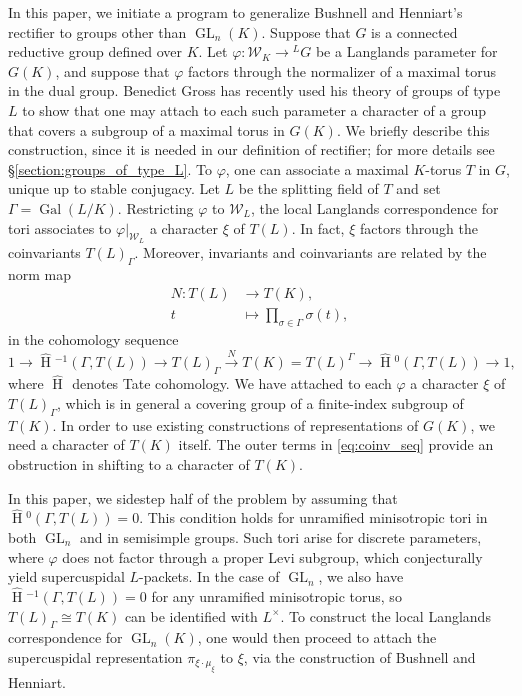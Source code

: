 \documentclass{amsart}
\theoremstyle{plain}
\newcommand{\HT}[1]{\hat{\HH}{}^{#1}}
\theoremstyle{definition}
\numberwithin{equation}{section}
\DeclareMathOperator{\Gal}{Gal}
\DeclareMathOperator{\HH}{H}
\DeclareMathOperator{\GL}{GL}
\newcommand{\Weil}{\mathcal{W}}
\begin{document}
In this paper, we initiate a program to generalize Bushnell and Henniart's
rectifier to groups other than $\GL_n(K)$. Suppose that $G$ is a connected reductive group defined over $K$.
Let $\varphi : \Weil_K \rightarrow {}^L G$ be a
Langlands parameter for $G(K)$, and suppose that $\varphi$ factors
through the normalizer of a maximal torus in the dual group.
Benedict Gross has recently used his theory of groups of type $L$ to show that one may attach to each such parameter a character of a group that covers a subgroup of a maximal torus in $G(K)$.  We briefly describe this construction, since it is needed in our definition of rectifier; for more details see \S \ref{section:groups_of_type_L}.
To $\varphi$, one can associate a maximal $K$-torus $T$ in $G$, unique up to
stable conjugacy.  Let $L$ be the splitting field of $T$ and set $\Gamma = \Gal(L/K)$.
Restricting $\varphi$ to $\Weil_L$, the local Langlands correspondence for tori associates to $\varphi|_{\Weil_L}$ a character $\xi$ of $T(L)$.  In fact, $\xi$ factors through the coinvariants $T(L)_{\Gamma}$.
Moreover, invariants and coinvariants are related by the norm map
\begin{align*}
N : T(L) &\rightarrow T(K),\\
t &\mapsto \displaystyle\prod_{\sigma \in \Gamma} \sigma(t),
\end{align*}
in the cohomology sequence
\begin{equation} \label{eq:coinv_seq}
1 \rightarrow \HT{-1}(\Gamma,T(L)) \rightarrow T(L)_{\Gamma} \xrightarrow{N} T(K) = T(L)^{\Gamma} \rightarrow \HT{0}(\Gamma,T(L)) \rightarrow 1,
\end{equation}
where $\HT{}$ denotes Tate cohomology.  We have attached to each $\varphi$ a character $\xi$ of $T(L)_{\Gamma}$, which is in general a covering group of a finite-index subgroup of $T(K)$.  In order to use existing constructions of representations of $G(K)$, we need a character of $T(K)$ itself.  The outer terms in \eqref{eq:coinv_seq} provide an obstruction in shifting to a character of $T(K)$.

In this paper, we sidestep half of the problem by assuming that $\HT{0}(\Gamma, T(L)) = 0$.  This condition holds for unramified minisotropic tori in both $\GL_n$
and in semisimple groups.  Such tori arise for discrete parameters, where $\varphi$ does not factor through a proper Levi subgroup,
which conjecturally yield supercuspidal $L$-packets.  In the case of $\GL_n$, we also have $\HT{-1}(\Gamma, T(L)) = 0$
for any unramified minisotropic torus, so $T(L)_{\Gamma} \cong T(K)$ can be identified with $L^{\times}$.  To construct the local Langlands
correspondence for $\GL_n(K)$, one would then proceed to
attach the supercuspidal representation $\pi_{\xi \cdot \mu_{\xi}}$ to $\xi$, via the construction of Bushnell and Henniart.
\end{document}

